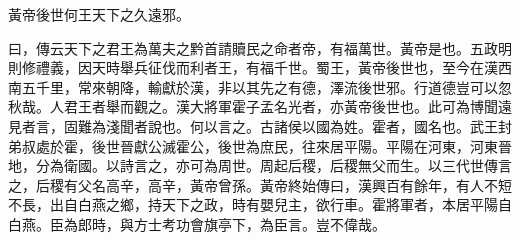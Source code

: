 黃帝後世何王天下之久遠邪。

曰，傳云天下之君王為萬夫之黔首請贖民之命者帝，有福萬世。黃帝是也。五政明則修禮義，因天時舉兵征伐而利者王，有福千世。蜀王，黃帝後世也，至今在漢西南五千里，常來朝降，輸獻於漢，非以其先之有德，澤流後世邪。行道德豈可以忽秋哉。人君王者舉而觀之。漢大將軍霍子孟名光者，亦黃帝後世也。此可為博聞遠見者言，固難為淺聞者說也。何以言之。古諸侯以國為姓。霍者，國名也。武王封弟叔處於霍，後世晉獻公滅霍公，後世為庶民，往來居平陽。平陽在河東，河東晉地，分為衛國。以詩言之，亦可為周世。周起后稷，后稷無父而生。以三代世傳言之，后稷有父名高辛，高辛，黃帝曾孫。黃帝終始傳曰，漢興百有餘年，有人不短不長，出自白燕之鄉，持天下之政，時有嬰兒主，欲行車。霍將軍者，本居平陽自白燕。臣為郎時，與方士考功會旗亭下，為臣言。豈不偉哉。
\twocolumn